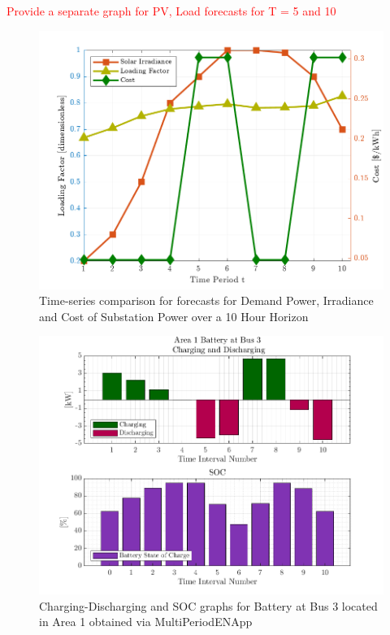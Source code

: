 \documentclass[../../outputs/main.tex]{subfiles}
\begin{document}
\textcolor{red}{Provide a separate graph for PV, Load forecasts for T = 5 and 10}

\begin{figure}[h!]
    \centering
    \includegraphics[height=0.25\textheight]{../figures/T10-inputCurves/InputCurves_Horizon_10_pv_20_batt_30.png}
    \caption{Time-series comparison for forecasts for Demand Power, Irradiance and Cost of Substation Power over a 10 Hour Horizon}
    \label{fig:inputCurve-10}
\end{figure}



\begin{figure}[h!]
    \centering
    \includegraphics[width=\linewidth]{../figures/T10-pv20-batt30-genCost/dopf/BatteryPlots/macroItr_5_genCost_Battery_1_alpha_0.001.png}
    \caption{Charging-Discharging and SOC graphs for Battery at Bus 3 located in Area 1 obtained via MultiPeriodENApp}
    \label{fig:batt-plot-dopf-10-20-30-genCost}
\end{figure}
    

\lipsum[1]
\end{document}
